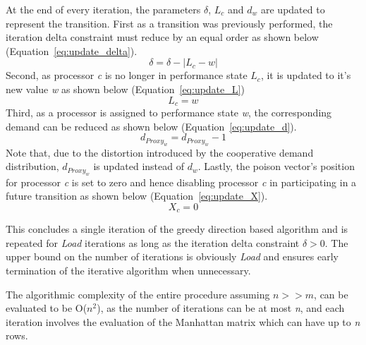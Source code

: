 At the end of every iteration, the parameters $\delta$, $L_c$ and $d_w$ are updated
to represent the transition. First as a transition was previously performed, the iteration delta constraint
must reduce by an equal order as shown below (Equation~\eqref{eq:update_delta}).
\begin{equation}
    \delta = \delta - |L_{c} - w| 
\label{eq:update_delta}
\end{equation}
Second, as processor \textit{c} is no longer in performance state $L_c$, it is updated to
it's new value \textit{w} as shown below (Equation~\eqref{eq:update_L}) 
\begin{equation}
    L_{c} = w 
\label{eq:update_L}
\end{equation}
Third, as a processor is assigned to performance state \textit{w},
the corresponding demand can be reduced as shown below (Equation~\eqref{eq:update_d}).
\begin{equation}
    d_{Proxy_w} = d_{Proxy_w} - 1 
\label{eq:update_d}
\end{equation}
Note that, due to the distortion introduced by the cooperative demand distribution, $d_{Proxy_w}$ is updated
instead of $d_w$. 
Lastly, the poison vector's position for processor
\textit{c} is set to zero and hence disabling processor \textit{c} in participating in a future transition as shown
below (Equation~\eqref{eq:update_X}).
\begin{equation}
    X_c = 0
\label{eq:update_X}
\end{equation}

This concludes a single iteration of the greedy direction based algorithm and is repeated for \textit{Load} iterations
as long as the iteration delta constraint $\delta > 0$. The upper bound on the number of iterations is obviously \textit{Load} 
and ensures early termination of the iterative algorithm when unnecessary.

The algorithmic complexity of the entire procedure assuming $n >> m$, can be evaluated to be O($n^2$), as the number
of iterations can be at most \textit{n}, and each iteration involves the evaluation of the Manhattan matrix which can
have up to \textit{n} rows. 

